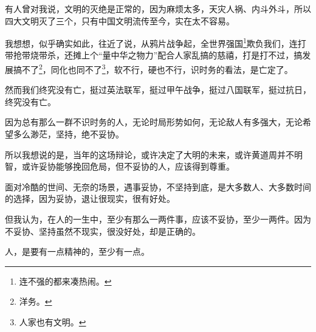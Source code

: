 \begin{multicols}{\theparacolNo}
		有人曾对我说，文明的灭绝是正常的，因为麻烦太多，天灾人祸、内斗外斗，所以四大文明灭了三个，只有中国文明流传至今，实在太不容易。

		我想想，似乎确实如此，往近了说，从鸦片战争起，全世界强国\footnote{连不强的都来凑热闹。}欺负我们，连打带抢带烧带杀，还摊上个“量中华之物力”配合人家乱搞的慈禧，打是打不过，搞发展搞不了\footnote{洋务。}，同化也同不了\footnote{人家也有文明。}，软不行，硬也不行，识时务的看法，是亡定了。

		然而我们终究没有亡，挺过英法联军，挺过甲午战争，挺过八国联军，挺过抗日，终究没有亡。

		因为总有那么一群不识时务的人，无论时局形势如何，无论敌人有多强大，无论希望多么渺茫，坚持，绝不妥协。

		所以我想说的是，当年的这场辩论，或许决定了大明的未来，或许黄道周并不明智，或许妥协能够挽回危局，但不妥协的人，应该得到尊重。

		面对冷酷的世间、无奈的场景，遇事妥协，不坚持到底，是大多数人、大多数时间的选择，因为妥协，退让很现实，很有好处。

		但我认为，在人的一生中，至少有那么一两件事，应该不妥协，至少一两件。因为不妥协、坚持虽然不现实，很没好处，却是正确的。

		人，是要有一点精神的，至少有一点。
		\ifnum{}
	\end{multicols}
\fi
\newpage
